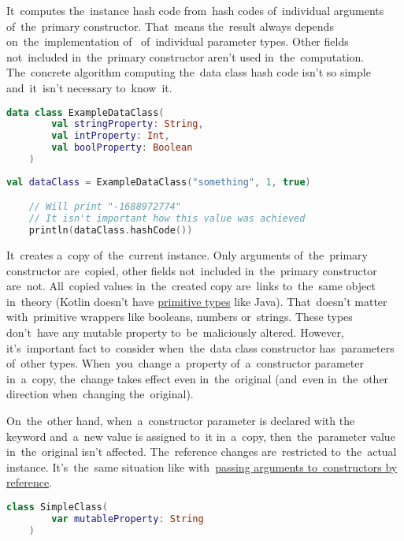 \label{kotlindataclasshashcode}
It~computes the~instance hash code from~hash codes of~individual arguments of~the~primary constructor.
That~means the~result always depends on~the~implementation of~ of~individual parameter types.
Other fields not~included in~the~primary constructor aren't used in~the~computation.
The~concrete algorithm computing the~data class hash code isn't so simple and~it~isn't necessary to~know~it.

\example
\begin{lstlisting}[language=Kotlin, title={Data class}]
    data class ExampleDataClass(
        val stringProperty: String,
        val intProperty: Int,
        val boolProperty: Boolean
    )
\end{lstlisting}
\begin{lstlisting}[language=Kotlin, title={\itq{hashCode} behavior}]
    val dataClass = ExampleDataClass("something", 1, true)

    // Will print "-1688972774"
    // It isn't important how this value was achieved
    println(dataClass.hashCode())
\end{lstlisting}

\label{kotlindataclasscopy}
It~creates a~copy of~the~current instance.
Only arguments of~the~primary constructor are~copied, other fields not~included in~the~primary constructor are~not.
All~copied values in~the~created copy are~links to~the~same object in~theory (Kotlin doesn't have \hyperref[javaprimitivetypes]{primitive types} like Java).
That~doesn't matter with~primitive wrappers like booleans, numbers or~strings.
These types don't~have any mutable property to~be~maliciously altered.
However, it's~important fact to~consider when~the~data class constructor has~parameters of~other types.
When~you~change a~property of~a~constructor parameter in~a~copy, the~change takes effect even in~the~original (and~even in~the~other direction when~changing the~original).

On~the~other hand, when~a~constructor parameter is declared with the~ keyword and~a~new value is assigned to~it in~a~copy, then~the~parameter value in~the~original isn't affected.
The~reference changes are~restricted to~the~actual instance.
It's~the~same situation like with~\hyperref[kotlinvalvar]{passing arguments to~constructors by reference}.

\example
\begin{lstlisting}[language=Kotlin, title={A class with mutable property}]
    class SimpleClass(
        var mutableProperty: String
    )
\end{lstlisting}
\newpage

